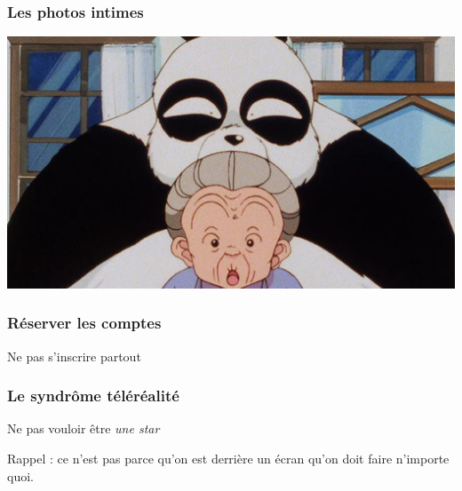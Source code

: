 \documentclass{beamer}
\begin{document}
\begin{frame}
\frametitle{Les photos intimes}
\begin{center}
\includegraphics[scale=0.6] {./images/Leak04.jpg} 
\end{center}
\end{frame}

\begin{frame}
\frametitle{Réserver les comptes}

\begin{block}{Ne pas s'inscrire partout}
\begin{itemize}
\end{itemize}
\end{block}
\end{frame}


\begin{frame}
\frametitle{Le syndrôme téléréalité}

\begin{block}{Ne pas vouloir être \emph{une star}}
\begin{itemize}
\end{itemize}
\end{block}
Rappel : ce n'est pas parce qu'on est derrière un écran qu'on doit faire n'importe quoi.
\end{frame}
\end{document}
